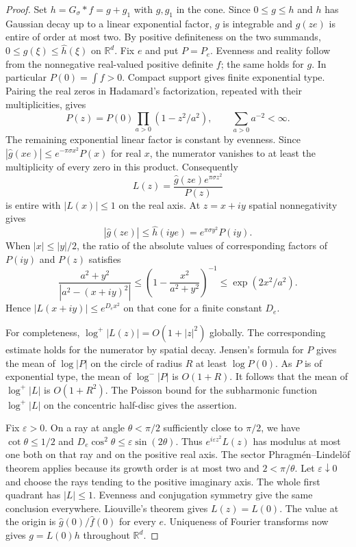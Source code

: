 \documentclass[11pt,a4paper]{article}
\numberwithin{equation}{section}
\begin{document}
\begin{proof}
Set $h=G_\sigma*f=g+g_1$ with $g,g_1$ in the cone. Since
$0\le g\le h$ and $h$ has Gaussian decay up to a linear exponential
factor, $g$ is integrable and $\widehat g(ze)$ is entire of order at
most two. By positive definiteness on the two summands,
$0\le\widehat g(\xi)\le\widehat h(\xi)$ on $\mathbb R^d$.
Fix $e$ and put $P=P_e$. Evenness and reality follow from the nonnegative
real-valued positive definite $f$; the same holds for $g$. In particular
$P(0)=\int f>0$. Compact support gives finite exponential type. Pairing
the real zeros in Hadamard's factorization, repeated with their
multiplicities, gives
\[
 P(z)=P(0)\prod_{a>0}(1-z^2/a^2),\qquad \sum_{a>0}a^{-2}<\infty.
\]
The remaining exponential linear factor is constant by evenness.
Since $|\widehat g(xe)|\le e^{-\pi\sigma x^2}P(x)$ for real $x$,
the numerator vanishes to at least the multiplicity of every zero in
this product. Consequently
\[
 L(z)=\frac{\widehat g(ze)e^{\pi\sigma z^2}}{P(z)}
\]
is entire with $|L(x)|\le1$ on the real axis. At $z=x+iy$ spatial
nonnegativity gives
\[
 |\widehat g(ze)|\le\widehat h(iye)=e^{\pi\sigma y^2}P(iy).
\]
When $|x|\le |y|/2$, the ratio of the absolute values of corresponding
factors of $P(iy)$ and $P(z)$ satisfies
\[
 \frac{a^2+y^2}{|a^2-(x+iy)^2|}
 \le \left(1-\frac{x^2}{a^2+y^2}\right)^{-1}
 \le \exp(2x^2/a^2).
\]
Hence $|L(x+iy)|\le e^{D_e x^2}$ on that cone for a finite constant $D_e$.

For completeness, $\log^+|L(z)|=O(1+|z|^2)$ globally.
The corresponding estimate holds for the numerator by spatial decay.
Jensen's formula for $P$ gives the mean of $\log|P|$ on the circle
of radius $R$ at least $\log P(0)$. As $P$ is of exponential type,
the mean of $\log^-|P|$ is $O(1+R)$. It follows that the mean of
$\log^+|L|$ is $O(1+R^2)$. The Poisson bound for the subharmonic
function $\log^+|L|$ on the concentric half-disc gives the assertion.

Fix $\varepsilon>0$. On a ray at angle $\theta<\pi/2$ sufficiently
close to $\pi/2$, we have $\cot\theta\le1/2$ and
$D_e\cos^2\theta\le\varepsilon\sin(2\theta)$. Thus
$e^{i\varepsilon z^2}L(z)$ has modulus at most one both on that ray
and on the positive real axis. The sector Phragm\'en--Lindel\"of
theorem applies because its growth order is at most two and
$2<\pi/\theta$. Let $\varepsilon\downarrow0$ and choose the rays
tending to the positive imaginary axis. The whole first quadrant has
$|L|\le1$. Evenness and conjugation symmetry give the same conclusion
everywhere. Liouville's theorem gives $L(z)=L(0)$. The value at the
origin is $\widehat g(0)/\widehat f(0)$ for every $e$. Uniqueness of
Fourier transforms now gives $g=L(0)h$ throughout $\mathbb R^d$.
\end{proof}
\end{document}
